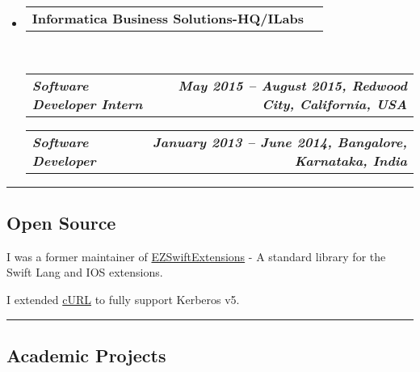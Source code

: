 \documentclass[10pt,letterpaper]{article}
\makeatletter
\newcommand{\headerrow}[2]
{\begin{tabular*}{\linewidth}{l@{\extracolsep{\fill}}r}
	#1 &
	#2 \\
\end{tabular*}}
\makeatother
\begin{document}
\begin{itemize}
\begin{itemize*}
\begin{itemize*}
		\end{itemize*}
	\end{itemize*}
	\item
		\headerrow
			{\textbf{Informatica Business Solutions-HQ/ILabs}}
			{\textbf{}}
		\\
		\headerrow
			{\emph{\textbf{Software Developer Intern}}}
			{\emph{\textbf{May 2015 -- August 2015, Redwood City, California, USA}}}
		\headerrow
			{\emph{\textbf{Software Developer}}}
			{\emph{\textbf{January 2013 -- June 2014, Bangalore, Karnataka, India}}}
\end{itemize}

\hrule
\vspace{-0.4em}

\subsection*{Open Source}

\begin{itemize*}
	\item I was a former maintainer of \href{https://github.com/goktugyil/EZSwiftExtensions}{EZSwiftExtensions} - A standard library for the Swift Lang and IOS extensions.
	\item I extended \href{https://github.com/Khalian/curl}{cURL} to fully support Kerberos v5. 
	
\end{itemize*}


\hrule
\vspace{-0.4em}

\subsection*{Academic Projects}
\end{document}
